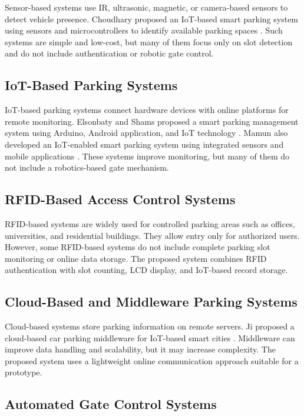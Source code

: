 Sensor-based systems use IR, ultrasonic, magnetic, or camera-based sensors to detect vehicle presence. Choudhary \etal proposed an IoT-based smart parking system using sensors and microcontrollers to identify available parking spaces \cite{b3}. Such systems are simple and low-cost, but many of them focus only on slot detection and do not include authentication or robotic gate control.

\subsection{IoT-Based Parking Systems}

IoT-based parking systems connect hardware devices with online platforms for remote monitoring. Elsonbaty and Shams proposed a smart parking management system using Arduino, Android application, and IoT technology \cite{b2}. Mamun \etal also developed an IoT-enabled smart parking system using integrated sensors and mobile applications \cite{b4}. These systems improve monitoring, but many of them do not include a robotics-based gate mechanism.

\subsection{RFID-Based Access Control Systems}

RFID-based systems are widely used for controlled parking areas such as offices, universities, and residential buildings. They allow entry only for authorized users. However, some RFID-based systems do not include complete parking slot monitoring or online data storage. The proposed system combines RFID authentication with slot counting, LCD display, and IoT-based record storage.

\subsection{Cloud-Based and Middleware Parking Systems}

Cloud-based systems store parking information on remote servers. Ji \etal proposed a cloud-based car parking middleware for IoT-based smart cities \cite{b1}. Middleware can improve data handling and scalability, but it may increase complexity. The proposed system uses a lightweight online communication approach suitable for a prototype.

\subsection{Automated Gate Control Systems}


